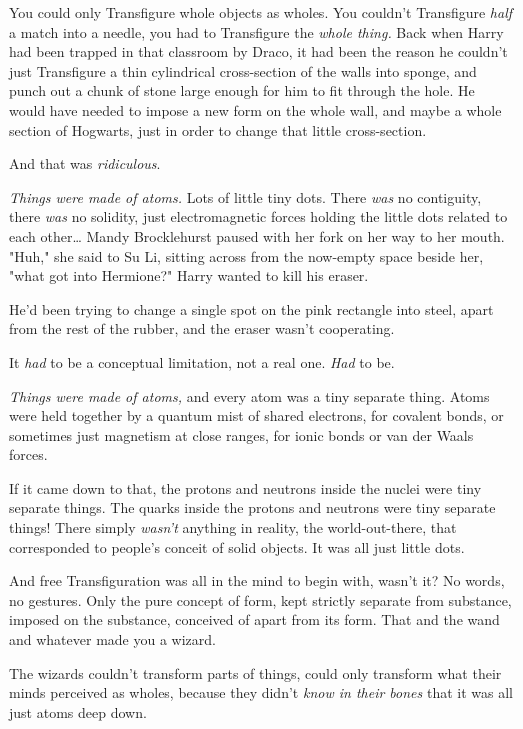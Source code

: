You could only Transfigure whole objects as wholes. You couldn't Transfigure
\emph{half} a match into a needle, you had to Transfigure the \emph{whole
thing.} Back when Harry had been trapped in that classroom by Draco, it had
been the reason he couldn't just Transfigure a thin cylindrical cross-section
of the walls into sponge, and punch out a chunk of stone large enough for him
to fit through the hole. He would have needed to impose a new form on the whole
wall, and maybe a whole section of Hogwarts, just in order to change that
little cross-section.

And that was \emph{ridiculous}.

\emph{Things were made of atoms.} Lots of little tiny dots. There \emph{was} no
contiguity, there \emph{was} no solidity, just electromagnetic forces holding
the little dots related to each other{\ldots}
\later
Mandy Brocklehurst paused with her fork on her way to her mouth. "Huh," she
said to Su Li, sitting across from the now-empty space beside her, "what got
into Hermione?"
\later
Harry wanted to kill his eraser.

He'd been trying to change a single spot on the pink rectangle into steel,
apart from the rest of the rubber, and the eraser wasn't cooperating.

It \emph{had} to be a conceptual limitation, not a real one. \emph{Had} to be.

\emph{Things were made of atoms,} and every atom was a tiny separate thing.
Atoms were held together by a quantum mist of shared electrons, for covalent
bonds, or sometimes just magnetism at close ranges, for ionic bonds or van der
Waals forces.

If it came down to that, the protons and neutrons inside the nuclei were tiny
separate things. The quarks inside the protons and neutrons were tiny separate
things! There simply \emph{wasn't} anything in reality, the world-out-there,
that corresponded to people's conceit of solid objects. It was all just little
dots.

And free Transfiguration was all in the mind to begin with, wasn't it? No
words, no gestures. Only the pure concept of form, kept strictly separate from
substance, imposed on the substance, conceived of apart from its form. That and
the wand and whatever made you a wizard.

The wizards couldn't transform parts of things, could only transform what their
minds perceived as wholes, because they didn't \emph{know in their bones} that
it was all just atoms deep down.


